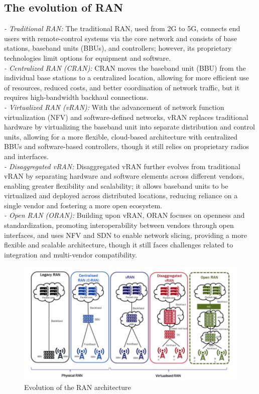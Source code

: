 \documentclass{report}
\begin{document}
\subsection{The evolution of RAN}
\textit{- Traditional RAN:} The traditional RAN, used from 2G to 5G, connects end users with remote-control systems via the core network and consists of base stations, baseband units (BBUs), and controllers; however, its proprietary technologies limit options for equipment and software.\\
\textit{- Centralized RAN (CRAN):} CRAN moves the baseband unit (BBU) from the individual base stations to a centralized location, allowing for more efficient use of resources, reduced costs, and better coordination of network traffic, but it requires high-bandwidth backhaul connections.\\
\textit{- Virtualized RAN (vRAN):} With the advancement of network function virtualization (NFV) and software-defined networks, vRAN replaces traditional hardware by virtualizing the baseband unit into separate distribution and control units, allowing for a more flexible, cloud-based architecture with centralized BBUs and software-based controllers, though it still relies on proprietary radios and interfaces.\\
\textit{- Disaggregated vRAN:} Disaggregated vRAN further evolves from traditional vRAN by separating hardware and software elements across different vendors, enabling greater flexibility and scalability; it allows baseband units to be virtualized and deployed across distributed locations, reducing reliance on a single vendor and fostering a more open ecosystem.\\
\textit{- Open RAN (ORAN):} Building upon vRAN, ORAN focuses on openness and standardization, promoting interoperability between vendors through open interfaces, and uses NFV and SDN to enable network slicing, providing a more flexible and scalable architecture, though it still faces challenges related to integration and multi-vendor compatibility.

\begin{figure}[h]
    \centering
    \includegraphics[width=0.79\linewidth]{figures/rantypes.png}
    \caption{Evolution of the RAN architecture\cite{moniem_vran_openran}}
    \label{fig:RANarchtypes}
\end{figure}
\end{document}
